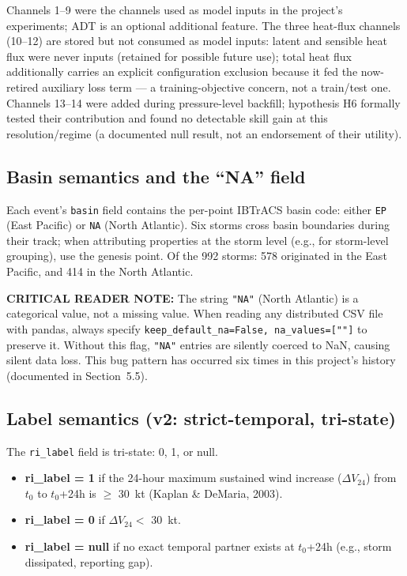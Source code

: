 \documentclass[11pt]{article}
\begin{document}
Channels 1--9 were the channels used as model inputs in the project's
experiments; ADT is an optional additional feature. The three heat-flux
channels (10--12) are stored but not consumed as model inputs: latent and
sensible heat flux were never inputs (retained for possible future use);
total heat flux additionally carries an explicit configuration exclusion
because it fed the now-retired auxiliary loss term --- a training-objective
concern, not a train/test one. Channels 13--14 were added during
pressure-level backfill; hypothesis H6 formally tested their contribution and
found no detectable skill gain at this resolution/regime (a documented null
result, not an endorsement of their utility).

\subsection{Basin semantics and the ``NA'' field}

Each event's \texttt{basin} field contains the per-point IBTrACS basin code:
either \texttt{EP} (East Pacific) or \texttt{NA} (North Atlantic). Six storms
cross basin boundaries during their track; when attributing properties at the
storm level (e.g., for storm-level grouping), use the genesis point. Of the
992 storms: 578 originated in the East Pacific, and 414 in the North
Atlantic.

\textbf{CRITICAL READER NOTE:} The string \texttt{"NA"} (North Atlantic) is a
categorical value, not a missing value. When reading any distributed CSV file
with pandas, always specify \texttt{keep\_default\_na=False, na\_values=[""]}
to preserve it. Without this flag, \texttt{"NA"} entries are silently coerced
to NaN, causing silent data loss. This bug pattern has occurred six times in
this project's history (documented in Section~5.5).

\subsection{Label semantics (v2: strict-temporal, tri-state)}

The \texttt{ri\_label} field is tri-state: 0, 1, or null.
\begin{itemize}
  \item \textbf{ri\_label = 1} if the 24-hour maximum sustained wind increase
  ($\Delta V_{24}$) from $t_0$ to $t_0$+24h is $\geq$ 30~kt (Kaplan \&
  DeMaria, 2003).
  \item \textbf{ri\_label = 0} if $\Delta V_{24} <$ 30~kt.
  \item \textbf{ri\_label = null} if no exact temporal partner exists at
  $t_0$+24h (e.g., storm dissipated, reporting gap).
\end{itemize}
\end{document}
